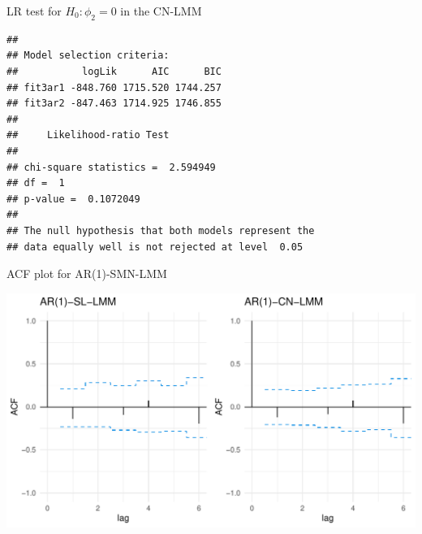\begin{frame}[fragile]{LR test for \(H_0: \phi_2=0\) in the CN-LMM}
\protect\hypertarget{lr-test-for-h_0-phi_20-in-the-cn-lmm}{}

\scriptsize

\begin{Shaded}
\begin{Highlighting}[]
\end{Highlighting}
\end{Shaded}

\begin{verbatim}
## 
## Model selection criteria:
##           logLik      AIC      BIC
## fit3ar1 -848.760 1715.520 1744.257
## fit3ar2 -847.463 1714.925 1746.855
## 
##     Likelihood-ratio Test
## 
## chi-square statistics =  2.594949 
## df =  1 
## p-value =  0.1072049 
## 
## The null hypothesis that both models represent the 
## data equally well is not rejected at level  0.05
\end{verbatim}

\end{frame}

\begin{frame}[fragile]{ACF plot for AR(1)-SMN-LMM}
\protect\hypertarget{acf-plot-for-ar1-smn-lmm}{}

\scriptsize

\begin{Shaded}
\begin{Highlighting}[]
\NormalTok{(}\NormalTok{(} \NormalTok{))}\OperatorTok{+}
\StringTok{               }\NormalTok{(}\NormalTok{),}
             \NormalTok{(} \NormalTok{))}\OperatorTok{+}
\StringTok{               }\NormalTok{(}\NormalTok{), }\NormalTok{)}
\end{Highlighting}
\end{Shaded}

\begin{center}\includegraphics[width=0.8\linewidth]{codes_files/figure-beamer/acf1-1} \end{center}

\end{frame}

